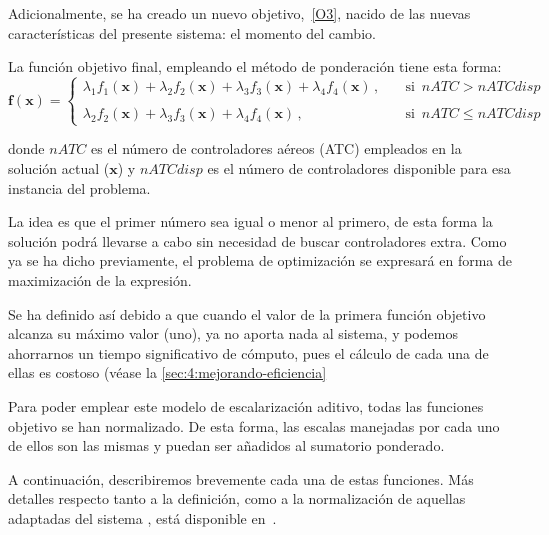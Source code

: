 Adicionalmente, se ha creado un nuevo objetivo,~\ref{O3}, nacido de las nuevas características del presente sistema: el momento del cambio.


La función objetivo final, empleando el método de ponderación tiene esta forma:
\[
    \textbf{f}(\textbf{x})=
    \begin{cases}
        \lambda_1 f_1(\textbf{x}) + \lambda_2 f_2(\textbf{x}) + \lambda_3 f_3(\textbf{x}) + \lambda_4 f_4(\textbf{x})\,, & \quad \textrm{si } \, nATC > nATCdisp  \\
        \\
        \lambda_2 f_2(\textbf{x}) + \lambda_3 f_3(\textbf{x}) + \lambda_4 f_4(\textbf{x})\,,                    & \quad \textrm{si } \,  nATC \le nATCdisp
    \end{cases}
\]

donde $nATC$ es el número de controladores aéreos (ATC) empleados en la solución actual ($\textbf{x}$) y $nATCdisp$ es el número de controladores disponible para esa instancia del problema. 

La idea es que el primer número sea igual o menor al primero, de esta forma la solución podrá llevarse a cabo sin necesidad de buscar controladores extra. Como ya se ha dicho previamente, el problema de optimización se expresará en forma de maximización de la expresión.

Se ha definido así debido a que cuando el valor de la primera función objetivo alcanza su máximo valor (uno), ya no aporta nada al sistema, y podemos ahorrarnos un tiempo significativo de cómputo, pues el cálculo de cada una de ellas es costoso (véase la \autoref{sec:4:mejorando-eficiencia} %

Para poder emplear este modelo de escalarización aditivo, todas las funciones objetivo se han normalizado. De esta forma, las escalas manejadas por cada uno de ellos son las mismas y puedan ser añadidos al sumatorio ponderado.

A continuación, describiremos brevemente cada una de estas funciones. Más detalles respecto tanto a la definición, como a la normalización de aquellas adaptadas del sistema \legacy{}, está disponible en~\cite{articulo2}.

